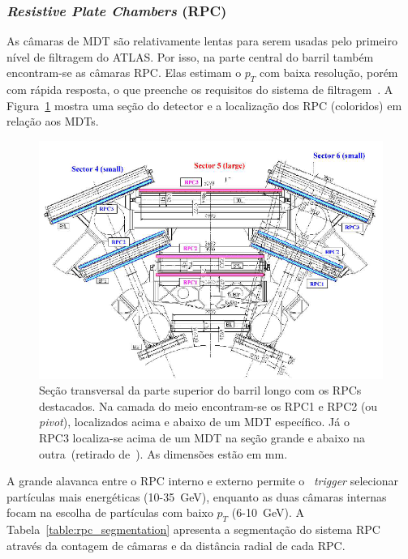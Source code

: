 \subsubsection*{\emph{Resistive Plate Chambers} (RPC)}

As câmaras de MDT são relativamente lentas para serem usadas pelo primeiro nível
de filtragem do ATLAS. Por isso, na parte central do barril também encontram-se
as câmaras RPC. Elas estimam o $p_T$ com baixa resolução, porém com rápida
resposta, o que preenche os requisitos do sistema de
filtragem~\cite{MUONTDR1997}. A Figura~\ref{fig:rpclocation} mostra uma seção do
detector e a localização dos RPC (coloridos) em relação aos MDTs. 

\begin{figure}[htpb!]
    \centering
        \includegraphics[width=\textwidth]{images/rpc_location.png}
        \caption[Localização dos RPCs na Seção transversal da parte superior do
        barril longo.]{Seção transversal da parte superior do barril longo com
        os RPCs destacados. Na camada do meio encontram-se os RPC1 e RPC2 (ou
        \emph{pivot}), localizados acima e abaixo de um MDT específico. Já o RPC3
        localiza-se acima de um MDT na seção grande e abaixo na outra~(retirado
        de~\cite{Aad:1275998}). As dimensões estão em mm.}
        \label{fig:rpclocation}
\end{figure}

A grande alavanca entre o RPC interno e
externo permite o ~\emph{trigger} selecionar partículas mais energéticas
(10-35~GeV), enquanto as duas câmaras internas focam na escolha de partículas com
baixo $p_T$ (6-10~GeV). A Tabela~\ref{table:rpc_segmentation} apresenta a
segmentação do sistema RPC através da contagem de câmaras e da distância radial
de cada RPC.

